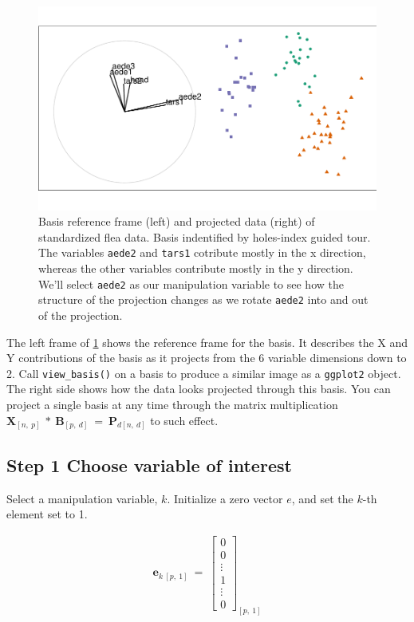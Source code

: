 \documentclass{monashthesis}
\begin{document}
\begin{figure}
\centering
\includegraphics{thesis_files/figure-latex/step0-1.pdf}
\caption{\label{fig:step0}Basis reference frame (left) and projected data (right) of standardized flea data. Basis indentified by holes-index guided tour. The variables \texttt{aede2} and \texttt{tars1} cotribute mostly in the x direction, whereas the other variables contribute mostly in the y direction. We'll select \texttt{aede2} as our manipulation variable to see how the structure of the projection changes as we rotate \texttt{aede2} into and out of the projection.}
\end{figure}

The left frame of \ref{fig:step0} shows the reference frame for the basis. It describes the X and Y contributions of the basis as it projects from the 6 variable dimensions down to 2. Call \texttt{view\_basis()} on a basis to produce a similar image as a \texttt{ggplot2} object. The right side shows how the data looks projected through this basis. You can project a single basis at any time through the matrix multiplication \(\textbf{X}_{[n,~p]} ~*~ \textbf{B}_{[p,~d]} ~=~ \textbf{P}_{d[n,~d]}\) to such effect.

\hypertarget{step-1-choose-variable-of-interest}{%
\subsection{Step 1 Choose variable of interest}\label{step-1-choose-variable-of-interest}}

Select a manipulation variable, \(k\). Initialize a zero vector \(e\), and set the \(k\)-th element set to 1.

\begin{align*}
\textbf{e}_{k~[p,~1]} ~=~ 
  \begin{bmatrix}
    0 \\
    0 \\
    \vdots \\
    1 \\
    \vdots \\
    0
  \end{bmatrix}_{[p,~1]}
\end{align*}
\end{document}
